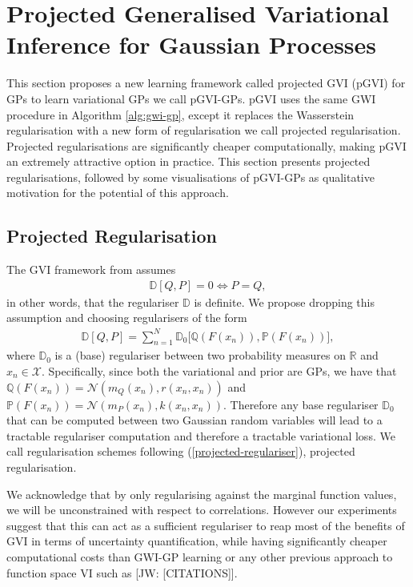 \documentclass{article}
\newcommand{\jw}[1]{{\color{gray} [JW: #1]}}
\numberwithin{equation}{section}
\begin{document}
\newpage
\section{Projected Generalised Variational Inference for Gaussian Processes}
This section proposes a new learning framework called projected GVI (pGVI) for GPs to learn variational GPs we call pGVI-GPs.
pGVI uses the same GWI procedure in Algorithm \ref{alg:gwi-gp}, except it replaces the Wasserstein regularisation with a new form of regularisation we call projected regularisation.
Projected regularisations are significantly cheaper computationally, making pGVI an extremely attractive option in practice.
This section presents projected regularisations, followed by some visualisations of pGVI-GPs as qualitative motivation for the potential of this approach.

\subsection{Projected Regularisation}
The GVI framework from \cite{knoblauch2022optimization} assumes
\begin{align}
    \mathbb{D}\left[Q, P\right] = 0 \Leftrightarrow P = Q,
\end{align}
in other words, that the regulariser $\mathbb{D}$ is definite.
We propose dropping this assumption and choosing regularisers of the form
\begin{align}
    \mathbb{D}\left[Q, P\right] = \sum_{{n}=1}^{N} \mathbb{D}_0 \Big[\mathbb{Q}\left(F(x_n)\right), \mathbb{P}\left(F(x_n)\right)\Big],
    \label{projected-regulariser}
\end{align}
where $\mathbb{D}_0$ is a (base) regulariser between two probability measures on $\mathbb{R}$ and $x_n \in \mathcal{X}$.
Specifically, since both the variational and prior are GPs, we have that $\mathbb{Q}\left(F(x_n)\right) = \mathcal{N}\left(m_Q(x_n), r(x_n, x_n)\right)$ and $\mathbb{P}\left(F(x_n)\right) = \mathcal{N}\left(m_P(x_n), k(x_n, x_n)\right)$.
Therefore any base regulariser $\mathbb{D}_0$ that can be computed between two Gaussian random variables will lead to a tractable regulariser computation and therefore a tractable variational loss. We call regularisation schemes following (\ref{projected-regulariser}), projected regularisation.

We acknowledge that by only regularising against the marginal function values, we will be unconstrained with respect to correlations.
However our experiments suggest that this can act as a  sufficient regulariser to reap most of the benefits of GVI in terms of uncertainty quantification, while having significantly cheaper computational costs than GWI-GP learning or any other previous approach to function space VI such as \jw{[CITATIONS]}.
\end{document}
